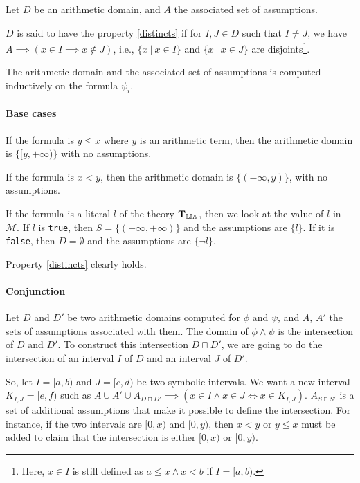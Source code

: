 \begin{property}[Distincts]

Let $D$ be an arithmetic domain, and $A$ the associated set of assumptions.

$D$ is said to have the property \ref{distincts} if for $I, J \in D$ such that
$I \neq J$, we have $A \implies (x \in I \implies x \not\in J)$, i.e.,
$\{x\ |\ x \in I\}$ and $\{x\ |\ x \in J\}$ are
disjoints\footnote{Here, $x \in I$ is still defined as $a \le x \land x < b$ if $I = [a, b)$.}.

\label{distincts}

\end{property}


The arithmetic domain and the associated set of assumptions is computed inductively on the formula
$\psi_i$.

\paragraph{Base cases}

If the formula is $y \le x$ where $y$ is an arithmetic term, then the arithmetic domain is
$\{[y, +\infty)\}$ with no assumptions.

If the formula is $x < y$, then the arithmetic domain is $\{(-\infty, y)\}$, with no assumptions.

If the formula is a literal $l$ of the theory $\operatorname{\mathbf{T}_{\mathbb{LIA}}}$, then we look at the value of $l$ in
$\mathcal{M}$. If $l$ is \texttt{true}, then $S = \{(-\infty, +\infty)\}$ and the assumptions are
$\{l\}$. If it is \texttt{false}, then $D = \emptyset$ and the assumptions are $\{\lnot l\}$.

Property \ref{distincts} clearly holds.

\paragraph{Conjunction}

Let $D$ and $D'$ be two arithmetic domains computed for $\phi$ and $\psi$, and
$A$, $A'$ the sets of assumptions associated with
them. The domain of $\phi\land\psi$ is the intersection of $D$ and $D'$. To construct this intersection $D \sqcap D'$, we are going to
do the intersection of an interval $I$ of $D$ and an interval $J$
of $D'$.

So, let $I = [a, b)$ and $J = [c, d)$ be two symbolic intervals. We want a new
interval $K_{I, J} = [e, f)$ such as
$A \cup A' \cup A_{D \sqcap D'} \implies \left(x \in I \land x \in J \iff x \in K_{I, J}\right)$.
$A_{S \sqcap S'}$ is a set of additional assumptions that make it possible to define
the
intersection. For instance, if the two intervals are $[0, x)$ and $[0, y)$, then $x < y$ or $y \le x$
must be added to claim that the intersection is either $[0, x)$ or $[0, y)$.

